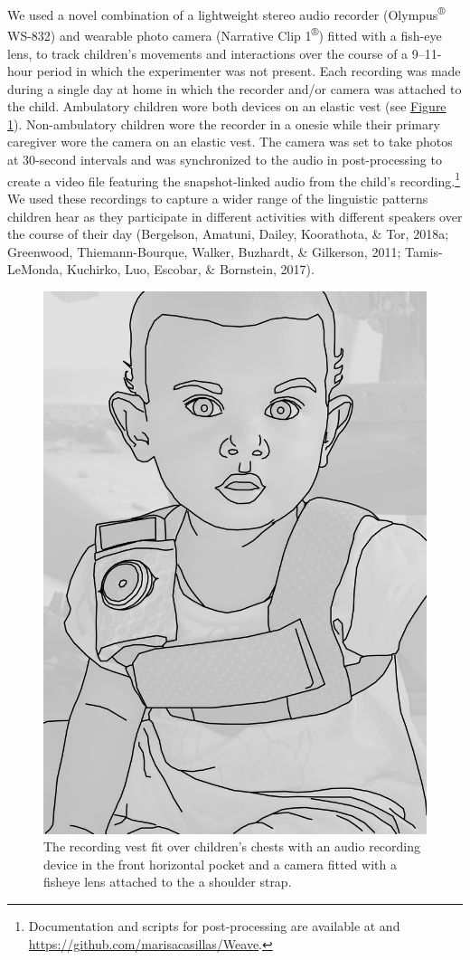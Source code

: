 \documentclass[floatsintext,man]{apa6}
\theoremstyle{definition}
\theoremstyle{definition}
\theoremstyle{definition}
\theoremstyle{remark}
\begin{document}
We used a novel combination of a lightweight stereo audio recorder
(Olympus\textsuperscript{®} WS-832) and wearable photo camera (Narrative
Clip 1\textsuperscript{®}) fitted with a fish-eye lens, to track
children's movements and interactions over the course of a 9--11-hour
period in which the experimenter was not present. Each recording was
made during a single day at home in which the recorder and/or camera was
attached to the child. Ambulatory children wore both devices on an
elastic vest (see \protect\hyperlink{fig1}{Figure 1}). Non-ambulatory
children wore the recorder in a onesie while their primary caregiver
wore the camera on an elastic vest. The camera was set to take photos at
30-second intervals and was synchronized to the audio in post-processing
to create a video file featuring the snapshot-linked audio from the
child's recording.\footnote{Documentation and scripts for
  post-processing are available at and
  \url{https://github.com/marisacasillas/Weave}.} We used these
recordings to capture a wider range of the linguistic patterns children
hear as they participate in different activities with different speakers
over the course of their day (Bergelson, Amatuni, Dailey, Koorathota, \&
Tor, 2018a; Greenwood, Thiemann-Bourque, Walker, Buzhardt, \& Gilkerson,
2011; Tamis-LeMonda, Kuchirko, Luo, Escobar, \& Bornstein, 2017).

\begin{figure}

{\centering \includegraphics[width=0.5\linewidth]{Tseltal-CLE_files/TseltalCLE-RecordingVest} 

}

\caption{The recording vest fit over children's chests with an audio recording device in the front horizontal pocket and a camera fitted with a fisheye lens attached to the a shoulder strap.}\label{fig:fig1}
\end{figure}
\end{document}
